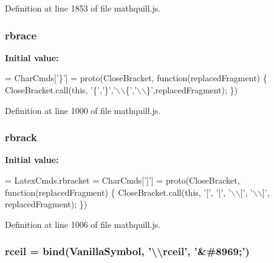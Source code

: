 Definition at line 1853 of file mathquill.\-js.

\subsubsection[{rbrace}]{ rbrace}\label{mathquill_8js_add6fcb57e5073d76fa91222b5603730c}
{\bfseries Initial value\-:}
\begin{DoxyCode}
= CharCmds[\textcolor{charliteral}{'\}'}] = proto(CloseBracket, \textcolor{keyword}{function}(replacedFragment) \{
  CloseBracket.call(\textcolor{keyword}{this}, \textcolor{charliteral}{'\{'},\textcolor{charliteral}{'\}'},\textcolor{stringliteral}{'\(\backslash\)\(\backslash\)\{'},\textcolor{stringliteral}{'\(\backslash\)\(\backslash\)\}'},replacedFragment);
\})
\end{DoxyCode}


Definition at line 1000 of file mathquill.\-js.

\subsubsection[{rbrack}]{ rbrack}\label{mathquill_8js_a95805e9753616db65084a17bf8b4ce70}
{\bfseries Initial value\-:}
\begin{DoxyCode}
= LatexCmds.rbracket = CharCmds[\textcolor{charliteral}{']'}] = proto(CloseBracket, \textcolor{keyword}{function}(replacedFragment) \{
  CloseBracket.call(\textcolor{keyword}{this}, \textcolor{charliteral}{'['}, \textcolor{charliteral}{']'}, \textcolor{stringliteral}{'\(\backslash\)\(\backslash\)['}, \textcolor{stringliteral}{'\(\backslash\)\(\backslash\)]'}, replacedFragment);
\})
\end{DoxyCode}


Definition at line 1006 of file mathquill.\-js.

\subsubsection[{rceil}]{ rceil = {\bf bind}({\bf Vanilla\-Symbol}, '\textbackslash{}\textbackslash{}rceil', '\&\#8969;')}\label{mathquill_8js_a0b3f5b65bfe3225032205ff45823d768}


